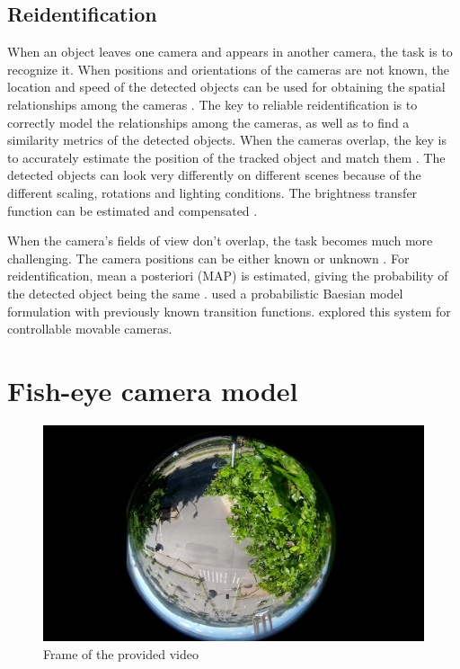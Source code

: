 \documentclass[a4paper,12pt,titlepage, twoside]{article}
\numberwithin{figure}{section}
\begin{document}
\subsection{Reidentification}
When an object leaves one camera and appears in another camera, the task is to recognize it. When positions and orientations of the cameras are not known, the location and speed of the detected objects can be used for obtaining the spatial relationships among the cameras \cite{makris2004bridging}. The key to reliable reidentification is to correctly model the relationships among the cameras, as well as to find a similarity metrics of the detected objects. When the cameras overlap, the key is to accurately estimate the position of the tracked object and match them \cite{khan2003consistent, krumm2000multi, zhao2005real}. The detected objects can look very differently on different scenes because of the different scaling, rotations and lighting conditions. The brightness transfer function can be estimated and compensated \cite{javed2005appearance, porikli2003inter}. 

When the camera's fields of view don't overlap, the task becomes much more challenging. The camera positions can be either known \cite{rahimi2004simultaneous} or unknown \cite{makris2004bridging}. For reidentification, mean a posteriori (MAP) is estimated, giving the probability of the detected object being the same \cite{javed2005appearance, huang1997object}. \cite{kettnaker1999bayesian} used a probabilistic Baesian model formulation with previously known transition functions. \cite{kang2003continuous} explored this system for controllable movable cameras. 




\section{Fish-eye camera model}
\label{sec:lens}

\begin{figure}[h]
\centering
\includegraphics[width=1\linewidth]{fig/stream1.png}
\caption{Frame of the provided video}
\label{fig:stream1}
\end{figure}
\end{document}
